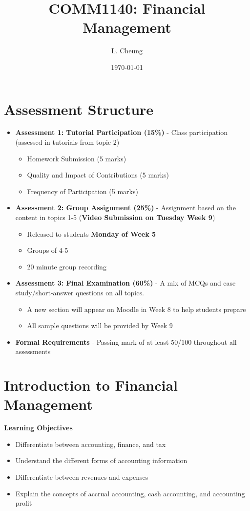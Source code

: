 \documentclass{article}
\title{\textbf{COMM1140: Financial Management}}
\author{L. Cheung}
\date{\today}
\begin{document}
\maketitle
\tableofcontents

\newpage

\section{Assessment Structure}
	\begin{itemize}
		\item \textbf{Assessment 1: Tutorial Participation (15\%)} - Class participation (assessed in tutorials from topic 2)
			\begin{itemize}
				\item Homework Submission (5 marks)
				\item Quality and Impact of Contributions (5 marks)
				\item Frequency of Participation (5 marks)
			\end{itemize}
		\item \textbf{Assessment 2: Group Assignment (25\%)} - Assignment based on the content in topics 1-5 (\textbf{Video Submission on Tuesday Week 9})
			\begin{itemize}
				\item Released to students \textbf{Monday of Week 5}
				\item Groups of 4-5
				\item 20 minute group recording
			\end{itemize}
		\item \textbf{Assessment 3: Final Examination (60\%)} - A mix of MCQs and case study/short-answer questions on all topics.
			\begin{itemize}
				\item A new section will appear on Moodle in Week 8 to help students prepare
				\item All sample questions will be provided by Week 9
			\end{itemize}
		\item \textbf{Formal Requirements} - Passing mark of at least 50/100 throughout all assessments
	\end{itemize}

\section{Introduction to Financial Management}
	\textbf{Learning Objectives}
		\begin{itemize}
			\item Differentiate between accounting, finance, and tax
			\item Understand the different forms of accounting information
			\item Differentiate between revenues and expenses
			\item Explain the concepts of accrual accounting, cash accounting, and accounting profit
		\end{itemize}
	
\end{document}
